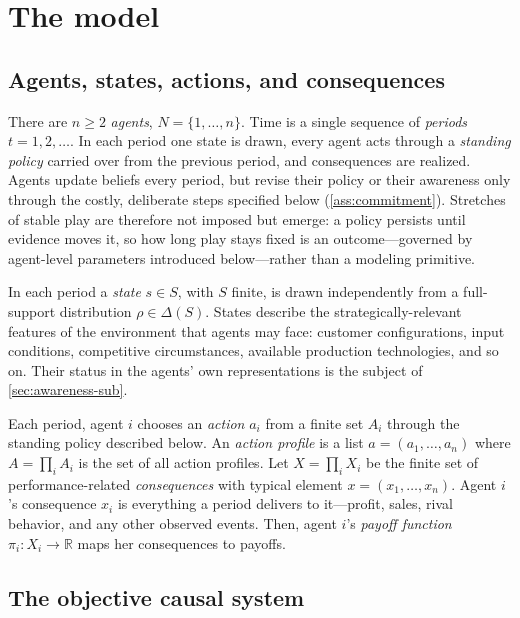 \documentclass[11pt]{article}
\theoremstyle{definition}
\begin{document}
\section{The model}
\label{sec:model}

\subsection{Agents, states, actions, and consequences}
\label{sec:primitives}

There are $n\ge 2$ \textit{agents}, $N=\{1,\dots,n\}$.
Time is a single sequence of \textit{periods} $t=1,2,\dots$.
In each period one state is drawn, every agent acts through a \emph{standing policy} carried over from the previous period, and consequences are realized.
Agents update beliefs every period, but revise their policy or their awareness only through the costly, deliberate steps specified below (\cref{ass:commitment}).
Stretches of stable play are therefore not imposed but emerge: a policy persists until evidence moves it, so how long play stays fixed is an outcome---governed by agent-level parameters introduced below---rather than a modeling primitive.

In each period a \textit{state} $s\in S$, with $S$ finite, is drawn independently from a full-support distribution $\rho\in\Delta(S)$.
States describe the strategically-relevant features of the environment that agents may face: customer configurations, input conditions, competitive circumstances, available production technologies, and so on.
Their status in the agents' own representations is the subject of \cref{sec:awareness-sub}.

Each period, agent \(i\) chooses an \textit{action} $a_i$ from a finite set $A_i$ through the standing policy described below.
An \textit{action profile} is a list $a=(a_1,\ldots,a_n)$ where $A=\prod_iA_i$ is the set of all action profiles.
Let $X=\prod_iX_i$ be the finite set of performance-related \textit{consequences} with typical element $x=(x_1,\dots,x_n)$.
Agent $i$'s consequence $x_i$ is everything a period delivers to it---profit, sales, rival behavior, and any other observed events.
Then, agent \(i\)'s \textit{payoff function} $\pi_i:X_i\to\mathbb R$ maps her consequences to payoffs.



\subsection{The objective causal system}
\label{sec:mechanisms-sub}
\end{document}
